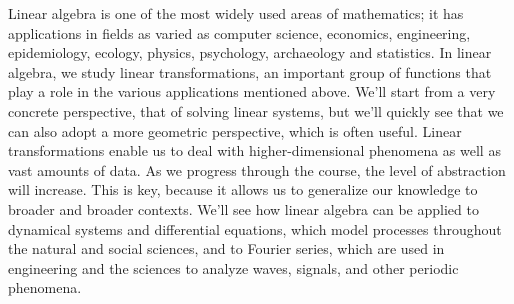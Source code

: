 Linear algebra is one of the most widely used areas of mathematics; it has applications in fields as varied as computer science, economics, engineering, epidemiology, ecology, physics, psychology, archaeology and statistics. In linear algebra, we study linear transformations, an important group of functions that play a role in the various applications mentioned above. We'll start from a very concrete perspective, that of solving linear systems, but we'll quickly see that we can also adopt a more geometric perspective, which is often useful. Linear transformations enable us to deal with higher-dimensional phenomena as well as vast amounts of data. As we progress through the course, the level of abstraction will increase. This is key, because it allows us to generalize our knowledge to broader and broader contexts. We'll see how linear algebra can be applied to dynamical systems and differential equations, which model processes throughout the natural and social sciences, and to Fourier series, which are used in engineering and the sciences to analyze waves, signals, and other periodic phenomena.
